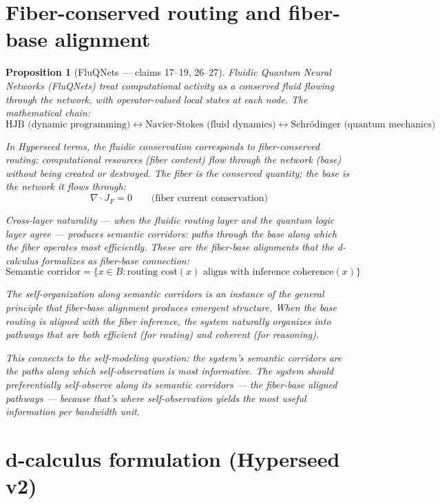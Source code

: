 \documentclass[11pt,a4paper]{article}
\newtheorem{proposition}[definition]{Proposition}
\begin{document}
\section{Fiber-conserved routing and fiber-base alignment}
\label{sec:fluqnets}

\begin{proposition}[FluQNets --- claims 17--19, 26--27]
\label{prop:fluqnets}
Fluidic Quantum Neural Networks (FluQNets) treat computational activity
as a conserved fluid flowing through the network, with operator-valued
local states at each node. The mathematical chain:
\[
  \text{HJB (dynamic programming)} \leftrightarrow
  \text{Navier-Stokes (fluid dynamics)} \leftrightarrow
  \text{Schr\"odinger (quantum mechanics)}
\]

In Hyperseed terms, the fluidic conservation corresponds to
\emph{fiber-conserved routing}: computational resources (fiber content)
flow through the network (base) without being created or destroyed.
The fiber is the conserved quantity; the base is the network it flows
through:
\[
  \nabla \cdot J_F = 0 \qquad \text{(fiber current conservation)}
\]

Cross-layer naturality --- when the fluidic routing layer and the
quantum logic layer agree --- produces \emph{semantic corridors}:
paths through the base along which the fiber operates most efficiently.
These are the fiber-base alignments that the d-calculus formalizes as
fiber-base connection:
\[
  \text{Semantic corridor} = \{x \in B : \text{routing cost}(x)
  \text{ aligns with inference coherence}(x)\}
\]

The self-organization along semantic corridors is an instance of the
general principle that fiber-base alignment produces emergent structure.
When the base routing is aligned with the fiber inference, the system
naturally organizes into pathways that are both efficient (for routing)
and coherent (for reasoning).

This connects to the self-modeling question: the system's semantic
corridors are the paths along which self-observation is most informative.
The system should preferentially self-observe along its semantic corridors
--- the fiber-base aligned pathways --- because that's where
self-observation yields the most useful information per bandwidth unit.
\end{proposition}

\section{d-calculus formulation (Hyperseed v2)}
\label{sec:v2}
\end{document}
